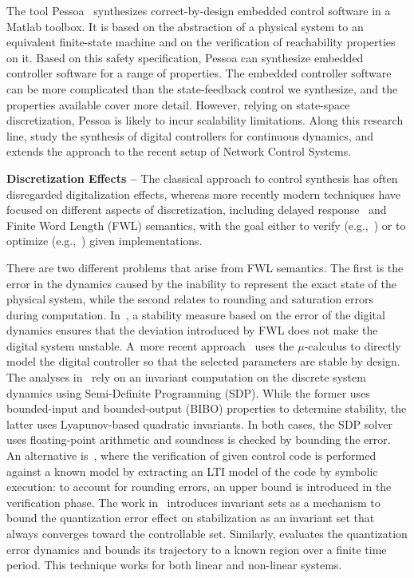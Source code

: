 \documentclass[sigconf]{llncs}
\begin{document}
The tool Pessoa~\cite{mazo2010pessoa} synthesizes correct-by-design embedded
control software in a Matlab toolbox.  It is based on the abstraction of a
physical system to an equivalent finite-state machine and on the
verification of reachability properties on it.  Based on this safety
specification, \mbox{Pessoa} can synthesize embedded controller software for
a range of properties.  The embedded controller software can be more
complicated than the state-feedback control we synthesize, and the
properties available cover more detail.  However, relying on state-space
discretization, \mbox{Pessoa} is likely to incur scalability limitations. 
Along this research line, \cite{Anta2010, liu16} study the synthesis of
digital controllers for continuous dynamics, and~\cite{zamani2014} extends
the approach to the recent setup of Network Control Systems.

\smallskip

\noindent\textbf{Discretization Effects --}
%
The classical approach to control synthesis has often disregarded
digitalization effects, whereas more recently modern techniques have focused
on different aspects of discretization, including delayed
response~\cite{Duggirala2015} and Finite Word Length (FWL) semantics, with
the goal either to verify (e.g.,~\cite{daes20161}) or to optimize
(e.g.,~\cite{oudjida2014design}) given implementations.

There are two different problems that arise from FWL semantics.  The first
is the error in the dynamics caused by the inability to represent the exact
state of the physical system, while the second relates to rounding and
saturation errors during computation.  In~\cite{fialho1994stability}, a
stability measure based on the error of the digital dynamics ensures that
the deviation introduced by FWL does not make the digital system unstable. 
A~more recent approach~\cite{DBLP:journals/automatica/WuLCC09} uses the
$\mu$-calculus to directly model the digital controller so that the selected
parameters are stable by design.  The analyses
in~\cite{DBLP:conf/hybrid/RouxJG15, DBLP:conf/hybrid/WangGRJF16} rely on an
invariant computation on the discrete system dynamics using Semi-Definite
Programming (SDP).  While the former uses bounded-input and bounded-output
(BIBO) properties to determine stability, the latter uses Lyapunov-based
quadratic invariants.  In both cases, the SDP solver uses floating-point
arithmetic and soundness is checked by bounding the error.  An alternative
is~\cite{park2016scalable}, where the verification of given control code is
performed against a known model by extracting an LTI model of the code by
symbolic execution: to account for rounding errors, an upper bound is
introduced in the verification phase.  The work
in~\cite{picasso2003stabilization} introduces invariant sets as a mechanism
to bound the quantization error effect on stabilization as an invariant set
that always converges toward the controllable set. 
Similarly, \cite{liberzon2003hybrid} evaluates the quantization error
dynamics and bounds its trajectory to a known region over a finite time
period.  This technique works for both linear and non-linear systems.
\end{document}
